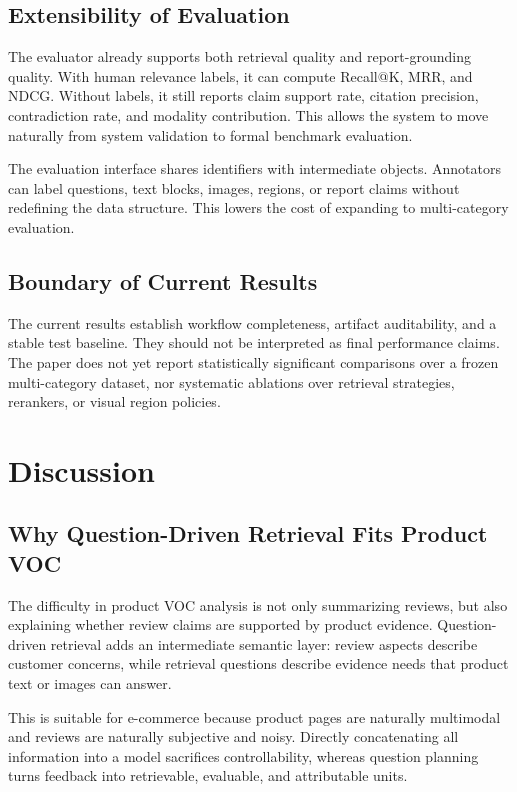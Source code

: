 \documentclass[11pt]{article}
\begin{document}
\subsection{Extensibility of Evaluation}

The evaluator already supports both retrieval quality and report-grounding quality. With human relevance labels, it can compute Recall@K, MRR, and NDCG. Without labels, it still reports claim support rate, citation precision, contradiction rate, and modality contribution. This allows the system to move naturally from system validation to formal benchmark evaluation.

The evaluation interface shares identifiers with intermediate objects. Annotators can label questions, text blocks, images, regions, or report claims without redefining the data structure. This lowers the cost of expanding to multi-category evaluation.

\subsection{Boundary of Current Results}

The current results establish workflow completeness, artifact auditability, and a stable test baseline. They should not be interpreted as final performance claims. The paper does not yet report statistically significant comparisons over a frozen multi-category dataset, nor systematic ablations over retrieval strategies, rerankers, or visual region policies.

\section{Discussion}
\subsection{Why Question-Driven Retrieval Fits Product VOC}

The difficulty in product VOC analysis is not only summarizing reviews, but also explaining whether review claims are supported by product evidence. Question-driven retrieval adds an intermediate semantic layer: review aspects describe customer concerns, while retrieval questions describe evidence needs that product text or images can answer.

This is suitable for e-commerce because product pages are naturally multimodal and reviews are naturally subjective and noisy. Directly concatenating all information into a model sacrifices controllability, whereas question planning turns feedback into retrievable, evaluable, and attributable units.
\end{document}
